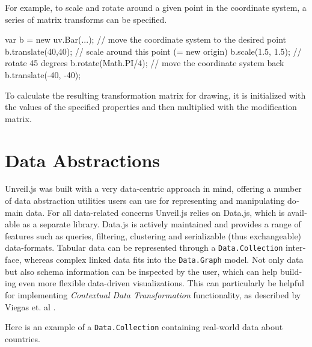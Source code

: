 \begin{english}
\SuperPar For example, to scale and rotate around a given point in the coordinate system, a series of matrix transforms can be specified.

\begin{program}
\begin{CppSourceCode}
var b = new uv.Bar({...});
// move the coordinate system to the desired point
b.translate(40,40);
// scale around this point (= new origin)
b.scale(1.5, 1.5);
// rotate 45 degrees
b.rotate(Math.PI/4);
// move the coordinate system back
b.translate(-40, -40);
\end{CppSourceCode}
\end{program}

\SuperPar To calculate the resulting transformation matrix for drawing, it is initialized with the values of the specified properties and then multiplied with
the modification matrix.

\section{Data Abstractions}
\label{cha:dataabstractions}

Unveil.js was built with a very data-centric approach in mind, offering a number of data abstraction utilities users can use for representing and manipulating domain data. For all data-related concerns Unveil.js relies on Data.js, which is available as a separate library. Data.js is actively maintained and provides a range of features such as queries, filtering, clustering and serializable (thus exchangeable) data-formats. Tabular data can be represented through a \texttt{Data.Collection} interface, whereas complex linked data fits into the \texttt{Data.Graph} model. Not only data but also schema information can be inspected by the user, which can help building even more flexible data-driven visualizations. This can particularly be helpful for implementing \emph{Contextual Data Transformation} functionality, as described by Viegas et. al \cite{manyeyes}.

Here is an example of a \texttt{Data.Collection} containing real-world data about countries.


\end{english}
